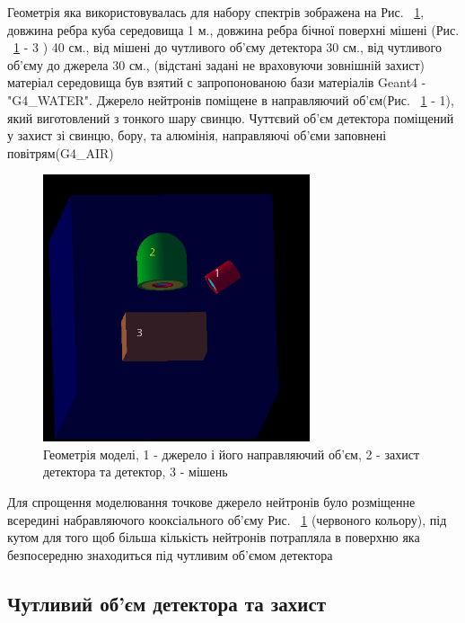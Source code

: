 \documentclass[a4paper, 14pt]{article}
\numberwithin{equation}{section}
\numberwithin{table}{section}
\begin{document}
	Геометрія яка використовувалась для набору спектрів зображена на Рис. ~\ref{ris:Geometry}, довжина ребра куба середовища 1 м., довжина ребра бічної поверхні мішені (Рис. ~\ref{ris:Geometry} - 3 ) 40 см., від мішені до чутливого об'єму детектора 30 см., від чутливого об'єму до джерела 30 см., (відстані задані не враховуючи зовнішній захист) матеріал середовища був взятий с запропонованою бази матеріалів Geant4 - "G4\_WATER". Джерело нейтронів поміщене в направляючий об'єм(Рис. ~\ref{ris:Geometry} - 1), який виготовлений з тонкого шару свинцю. Чуттєвий об'єм детектора поміщений у захист зі свинцю, бору, та алюмінія, направляючі об'єми заповнені повітрям(G4\_AIR)
	\begin{figure}[hbt!]
		\centering \includegraphics[width=0.7\textwidth]{images/geometryAll.png}
		\caption{Геометрія моделі, 1 - джерело і його направляючий об'єм, 2 - захист детектора та детектор, 3 - мішень} 
		\label{ris:Geometry}	
	\end{figure}
	
	Для спрощення моделювання точкове джерело нейтронів було розміщенне всередині набравляючого кооксіального об'єму Рис. ~\ref{ris:Geometry} (червоного кольору), під кутом для того щоб більша кількість нейтронів потрапляла в поверхню яка безпосередню знаходиться під чутливим об'ємом детектора 
	
	
	\subsection{Чутливий об'єм детектора та захист}
	
\end{document}
